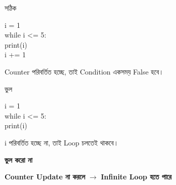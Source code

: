 \noindent
\begin{minipage}[t]{0.49\linewidth}

\begin{sideexamplebox}{সঠিক}

\begin{sidecodebox}
\begin{english}
\ttfamily
i = 1\\
while i <= 5:\\
\hspace*{4mm}print(i)\\
\hspace*{4mm}i += 1
\end{english}
\end{sidecodebox}

Counter পরিবর্তিত হচ্ছে, তাই Condition একসময় False হবে।

\end{sideexamplebox}

\end{minipage}
\hfill
\begin{minipage}[t]{0.49\linewidth}

\begin{sideexamplebox}{ভুল}

\begin{sidecodebox}
\begin{english}
\ttfamily
i = 1\\
while i <= 5:\\
\hspace*{4mm}print(i)
\end{english}
\end{sidecodebox}

\textenglish{\ttfamily i}
পরিবর্তিত হচ্ছে না, তাই Loop চলতেই থাকবে।

\end{sideexamplebox}

\end{minipage}

\begin{rememberbox}

\textbf{\color{deepOrange}ভুল করো না}

\begin{center}

\textbf{Counter Update না করলে}
\(\longrightarrow\)
\textbf{Infinite Loop হতে পারে}

\end{center}

\end{rememberbox}

